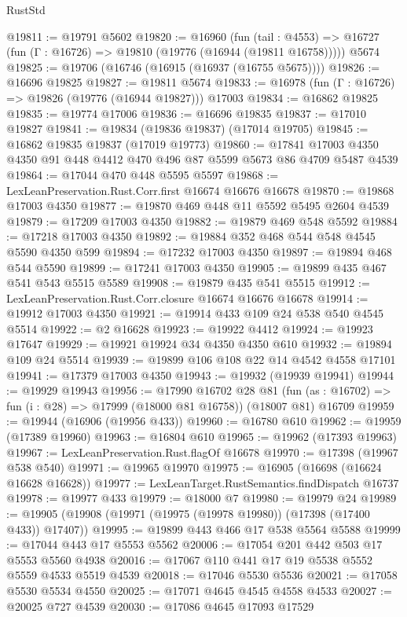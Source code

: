 \begin{lexlean}{RustStd}
\begin{coremodule}
@19811 := @19791 @5602
@19820 := @16960
    (fun (tail : @4553) => @16727 (fun (Γ : @16726) => @19810 (@19776 (@16944 (@19811 @16758)))))
    @5674
@19825 := @19706 (@16746 (@16915 (@16937 (@16755 @5675))))
@19826 := @16696 @19825
@19827 := @19811 @5674
@19833 := @16978 (fun (Γ : @16726) => @19826 (@19776 (@16944 @19827))) @17003
@19834 := @16862 @19825
@19835 := @19774 @17006
@19836 := @16696 @19835
@19837 := @17010 @19827
@19841 := @19834 (@19836 @19837) (@17014 @19705)
@19845 := @16862 @19835 @19837 (@17019 @19773)
@19860 := @17841 @17003 @4350 @4350 @91 @448 @4412 @470 @496 @87 @5599 @5673 @86 @4709 @5487 @4539
@19864 := @17044 @470 @448 @5595 @5597
@19868 := LexLeanPreservation.Rust.Corr.first @16674 @16676 @16678
@19870 := @19868 @17003 @4350
@19877 := @19870 @469 @448 @11 @5592 @5495 @2604 @4539
@19879 := @17209 @17003 @4350
@19882 := @19879 @469 @548 @5592
@19884 := @17218 @17003 @4350
@19892 := @19884 @352 @468 @544 @548 @4545 @5590 @4350 @599
@19894 := @17232 @17003 @4350
@19897 := @19894 @468 @544 @5590
@19899 := @17241 @17003 @4350
@19905 := @19899 @435 @467 @541 @543 @5515 @5589
@19908 := @19879 @435 @541 @5515
@19912 := LexLeanPreservation.Rust.Corr.closure @16674 @16676 @16678
@19914 := @19912 @17003 @4350
@19921 := @19914 @433 @109 @24 @538 @540 @4545 @5514
@19922 := @2 @16628
@19923 := @19922 @4412
@19924 := @19923 @17647
@19929 := @19921 @19924 @34 @4350 @4350 @610
@19932 := @19894 @109 @24 @5514
@19939 := @19899 @106 @108 @22 @14 @4542 @4558 @17101
@19941 := @17379 @17003 @4350
@19943 := @19932 (@19939 @19941)
@19944 := @19929 @19943
@19956 := @17990
    @16702
    @28
    @81
    (fun (as : @16702) => fun (i : @28) => @17999 (@18000 @81 @16758))
    (@18007 @81)
    @16709
@19959 := @19944 (@16906 (@19956 @433))
@19960 := @16780 @610
@19962 := @19959 (@17389 @19960)
@19963 := @16804 @610
@19965 := @19962 (@17393 @19963)
@19967 := LexLeanPreservation.Rust.flagOf @16678
@19970 := @17398 (@19967 @538 @540)
@19971 := @19965 @19970
@19975 := @16905 (@16698 (@16624 @16628 @16628))
@19977 := LexLeanTarget.RustSemantics.findDispatch @16737
@19978 := @19977 @433
@19979 := @18000 @7
@19980 := @19979 @24
@19989 := @19905 (@19908 (@19971 (@19975 (@19978 @19980)) (@17398 (@17400 @433)) @17407))
@19995 := @19899 @443 @466 @17 @538 @5564 @5588
@19999 := @17044 @443 @17 @5553 @5562
@20006 := @17054 @201 @442 @503 @17 @5553 @5560 @4938
@20016 := @17067 @110 @441 @17 @19 @5538 @5552 @5559 @4533 @5519 @4539
@20018 := @17046 @5530 @5536
@20021 := @17058 @5530 @5534 @4550
@20025 := @17071 @4645 @4545 @4558 @4533
@20027 := @20025 @727 @4539
@20030 := @17086 @4645 @17093 @17529

\end{coremodule}
\end{lexlean}
